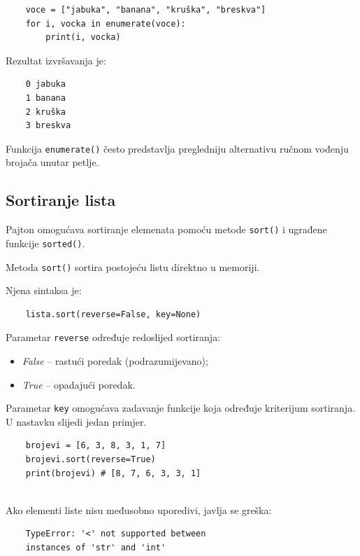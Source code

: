 \begin{verbatim}
	voce = ["jabuka", "banana", "kruška", "breskva"]
	for i, vocka in enumerate(voce):
	    print(i, vocka)
\end{verbatim}

Rezultat izvršavanja je:

\begin{verbatim}
	0 jabuka
	1 banana
	2 kruška
	3 breskva
\end{verbatim}

Funkcija \texttt{enumerate()} često predstavlja pregledniju alternativu ručnom vođenju brojača unutar petlje.

\subsection{Sortiranje lista}

Pajton omogućava sortiranje elemenata pomoću metode \texttt{sort()} i ugrađene funkcije \texttt{sorted()}.

Metoda \texttt{sort()} sortira postojeću listu direktno u memoriji.

Njena sintaksa je:

\begin{verbatim}
	lista.sort(reverse=False, key=None)
\end{verbatim}

Parametar \texttt{reverse} određuje redoslijed sortiranja:

\begin{itemize}
	\item \textit{False} -- rastući poredak (podrazumijevano);
	\item \textit{True} -- opadajući poredak.
\end{itemize}

Parametar \texttt{key} omogućava zadavanje funkcije koja određuje kriterijum sortiranja. U nastavku slijedi jedan primjer. 

\begin{verbatim}
	brojevi = [6, 3, 8, 3, 1, 7]
	brojevi.sort(reverse=True)
	print(brojevi) # [8, 7, 6, 3, 3, 1]
	
\end{verbatim}

Ako elementi liste nisu međusobno uporedivi, javlja se greška:

\begin{verbatim}
	TypeError: '<' not supported between
	instances of 'str' and 'int'
\end{verbatim}

